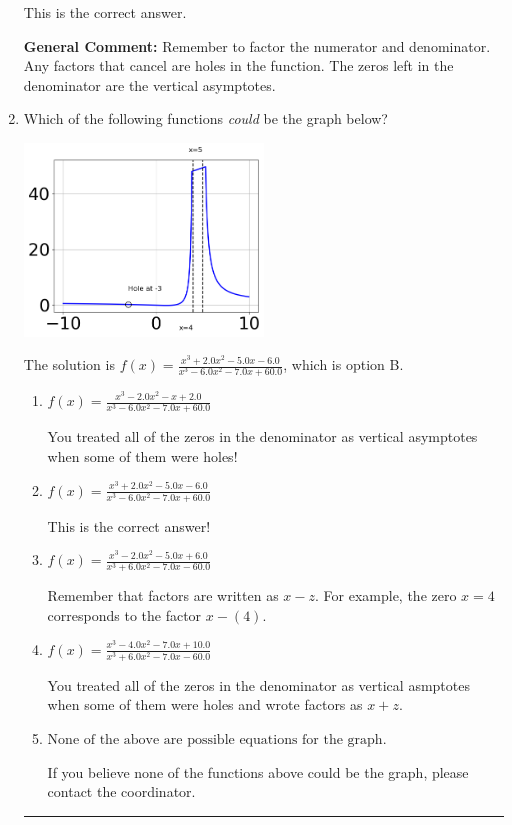 \documentclass{extbook}[14pt]
\newcommand{\litem}[1]{\item #1

\rule{\textwidth}{0.4pt}}
\begin{document}
\begin{enumerate}
{\begin{enumerate}[label=\Alph*.]
This is the correct answer.
\end{enumerate}

\textbf{General Comment:} Remember to factor the numerator and denominator. Any factors that cancel are holes in the function. The zeros left in the denominator are the vertical asymptotes.
}
\litem{
Which of the following functions \textit{could} be the graph below?

\begin{center}
    \includegraphics[width=0.5\textwidth]{../Figures/identifyGraphOfRationalFunctionCopyB.png}
\end{center}


The solution is \( f(x)=\frac{x^{3} +2.0 x^{2} -5.0 x -6.0}{x^{3} -6.0 x^{2} -7.0 x + 60.0} \), which is option B.\begin{enumerate}[label=\Alph*.]
\item \( f(x)=\frac{x^{3} -2.0 x^{2} -x + 2.0}{x^{3} -6.0 x^{2} -7.0 x + 60.0} \)

You treated all of the zeros in the denominator as vertical asymptotes when some of them were holes!
\item \( f(x)=\frac{x^{3} +2.0 x^{2} -5.0 x -6.0}{x^{3} -6.0 x^{2} -7.0 x + 60.0} \)

This is the correct answer!
\item \( f(x)=\frac{x^{3} -2.0 x^{2} -5.0 x + 6.0}{x^{3} +6.0 x^{2} -7.0 x -60.0} \)

Remember that factors are written as $x-z$. For example, the zero $x=4$ corresponds to the factor $x-(4)$.
\item \( f(x)=\frac{x^{3} -4.0 x^{2} -7.0 x + 10.0}{x^{3} +6.0 x^{2} -7.0 x -60.0} \)

You treated all of the zeros in the denominator as vertical asmptotes when some of them were holes and wrote factors as $x+z$.
\item \( \text{None of the above are possible equations for the graph.} \)

If you believe none of the functions above could be the graph, please contact the coordinator.
\end{enumerate}

}
\end{enumerate}
\end{document}
